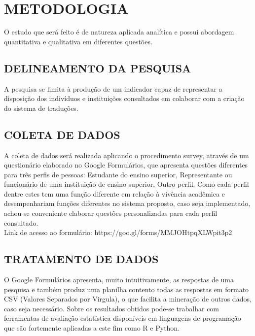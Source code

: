 
\chapter{METODOLOGIA}
\label{chap:metodologia}
O estudo que será feito é de natureza aplicada analítica e possui abordagem quantitativa e qualitativa em diferentes questões.

\section{DELINEAMENTO DA PESQUISA}
\label{sec:MetDelPesq}
A pesquisa se limita à produção de um indicador capaz de representar a disposição dos indivíduos e instituições consultados em colaborar com a criação do sistema de traduções.

\section{COLETA DE DADOS}
\label{sec:MetColDad}
A coleta de dados será realizada aplicando o procedimento survey, através de um questionário elaborado no Google Formulários, que apresenta questões diferentes para três perfis de pessoas: Estudante do ensino superior, Representante ou funcionário de uma instituição de ensino superior, Outro perfil. Como cada perfil dentre estes tem uma função diferente em relação à vivência acadêmica e desempenhariam funções diferentes no sistema proposto, caso seja implementado, achou-se conveniente elaborar questões personalizadas para cada perfil consultado.\\

Link de acesso ao formulário: https://goo.gl/forms/MMJOHtpqXLWpit3p2

\section{TRATAMENTO DE DADOS}
\label{sec:MetTratDad}
O Google Formulários apresenta, muito intuitivamente, as respostas de uma pesquisa e também produz uma planilha contento todas as respostas em formato CSV (Valores Separados por Virgula), o que facilita a mineração de outros dados, caso seja necessário. Sobre os resultados obtidos pode-se trabalhar com ferramentas de avaliação estatística disponíveis em linguagens de programação que são fortemente aplicadas a este fim como R e Python.
